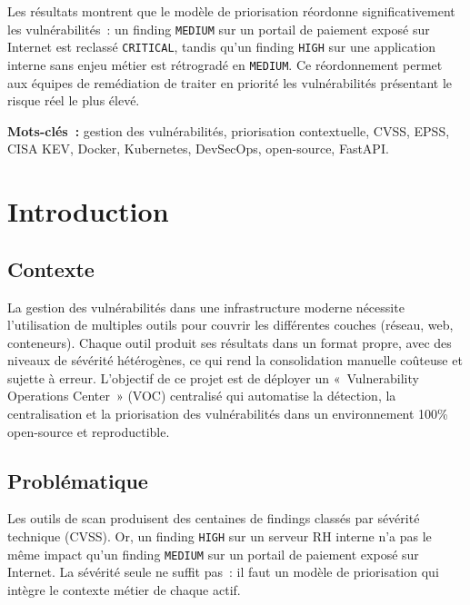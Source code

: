 \documentclass[12pt,a4paper]{report}
\begin{document}
Les résultats montrent que le modèle de priorisation réordonne significativement les vulnérabilités~: un finding \texttt{MEDIUM} sur un portail de paiement exposé sur Internet est reclassé \texttt{CRITICAL}, tandis qu'un finding \texttt{HIGH} sur une application interne sans enjeu métier est rétrogradé en \texttt{MEDIUM}. Ce réordonnement permet aux équipes de remédiation de traiter en priorité les vulnérabilités présentant le risque réel le plus élevé.

\vspace{1cm}
\textbf{Mots-clés~:} gestion des vulnérabilités, priorisation contextuelle, CVSS, EPSS, CISA KEV, Docker, Kubernetes, DevSecOps, open-source, FastAPI.
\newpage

\tableofcontents
\newpage
\listoffigures
\listoftables
\newpage


\chapter{Introduction}

\section{Contexte}
La gestion des vulnérabilités dans une infrastructure moderne nécessite l'utilisation de multiples outils pour couvrir les différentes couches (réseau, web, conteneurs). Chaque outil produit ses résultats dans un format propre, avec des niveaux de sévérité hétérogènes, ce qui rend la consolidation manuelle coûteuse et sujette à erreur. L'objectif de ce projet est de déployer un «~Vulnerability Operations Center~» (VOC) centralisé qui automatise la détection, la centralisation et la priorisation des vulnérabilités dans un environnement 100\% open-source et reproductible.

\section{Problématique}
Les outils de scan produisent des centaines de findings classés par sévérité technique (CVSS). Or, un finding \texttt{HIGH} sur un serveur RH interne n'a pas le même impact qu'un finding \texttt{MEDIUM} sur un portail de paiement exposé sur Internet. La sévérité seule ne suffit pas~: il faut un modèle de priorisation qui intègre le contexte métier de chaque actif.
\end{document}
